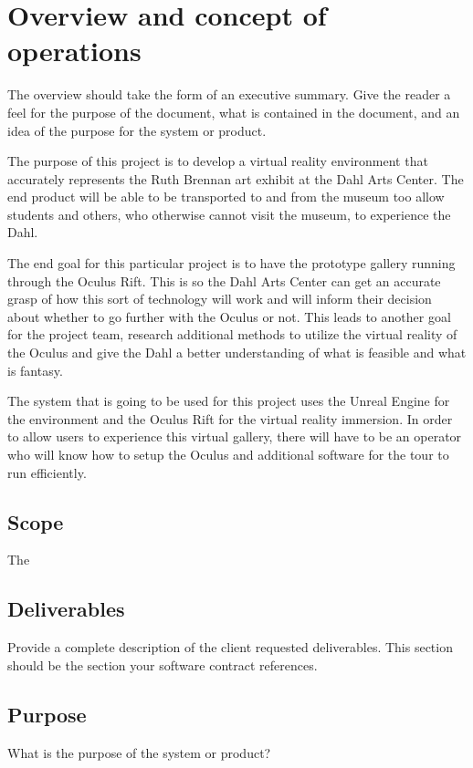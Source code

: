 
\chapter{Overview and concept of operations}

The overview should take the form of an executive summary.  Give the reader a feel 
for the purpose of the document, what is contained in the document, and an idea 
of the purpose for the system or product. 

The purpose of this project is to develop a virtual reality environment that accurately represents the Ruth Brennan art exhibit at the Dahl Arts Center.  The end product will be able to be transported to and from the museum too allow students and others, who otherwise cannot visit the museum, to experience the Dahl.

The end goal for this particular project is to have the prototype gallery running through the Oculus Rift.  This is so the Dahl Arts Center can get an accurate grasp of how this sort of technology will work and will inform their decision about whether to go further with the Oculus or not.  This leads to another goal for the project team, research additional methods to utilize the virtual reality of the Oculus and give the Dahl a better understanding of what is feasible and what is fantasy.

The system that is going to be used for this project uses the Unreal Engine for the environment and the Oculus Rift for the virtual reality immersion.  In order to allow users to experience this virtual gallery, there will have to be an operator who will know how to setup the Oculus and additional software for the tour to run efficiently.  

\section{Scope}
The

\section{Deliverables}

Provide a complete description of the client requested deliverables.   This section should be the section your software contract references.   

\section{Purpose}
What is the purpose of the system or product? 


